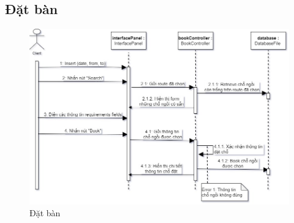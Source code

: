 
\subsection{Đặt bàn}



\begin{figure}[!h]
    \begin{center}
        \includegraphics[scale=0.5]{Images/SequenceDiagram/booking_sd.jpg}
    \end{center}
    \hspace{0.3cm}
    \caption{Đặt bàn}
\end{figure}

